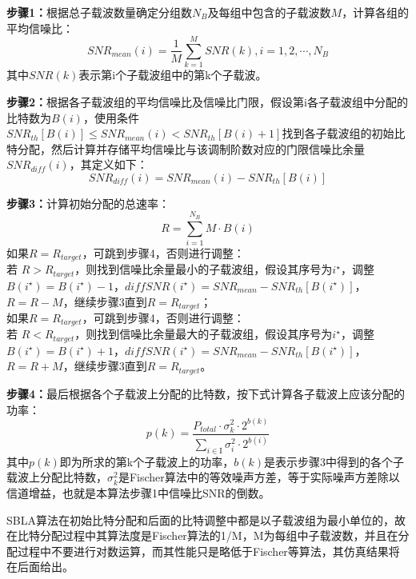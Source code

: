 \begin{description}
\item{\bf{步骤1：}}根据总子载波数量确定分组数$N_B$及每组中包含的子载波数$M$，计算各组的平均信噪比：
\begin{equation}
SNR_{mean}(i) = \frac{1}{M}\sum_{k=1}^M SNR(k), i=1,2,\cdots,N_B
\end{equation}
其中$SNR(k)$表示第i个子载波组中的第k个子载波。
\item{\bf{步骤2：}}根据各子载波组的平均信噪比及信噪比门限，假设第i各子载波组中分配的比特数为$B(i)$，使用条件$SNR_{th}[B(i)]\leq SNR_{mean}(i) < SNR_{th}[B(i)+1]$找到各子载波组的初始比特分配，然后计算并存储平均信噪比与该调制阶数对应的门限信噪比余量$SNR_{diff}(i)$，其定义如下：
\begin{equation}
SNR_{diff}(i) = SNR_{mean}(i) - SNR_{th}[B(i)]
\end{equation}
\item{\bf{步骤3：}}计算初始分配的总速率：
\begin{equation}
R = \sum_{i=1}^{N_B} M \cdot B(i)
\end{equation}
如果$R=R_{target}$，可跳到步骤4，否则进行调整：\\
若 $R>R_{target}$，则找到信噪比余量最小的子载波组，假设其序号为$i^\star$，调整$B(i^\star)=B(i^\star)-1$，$diffSNR(i^\star)=SNR_{mean}-SNR_{th}[B(i^\star)]$，$R=R-M$，继续步骤3直到$R=R_{target}$；\\
如果$R=R_{target}$，可跳到步骤4，否则进行调整：\\
若 $R<R_{target}$，则找到信噪比余量最大的子载波组，假设其序号为$i^\star$，调整$B(i^\star)=B(i^\star)+1$，$diffSNR(i^\star)=SNR_{mean}-SNR_{th}[B(i^\star)]$，$R=R+M$，继续步骤3直到$R=R_{target}$。\\
\item{\bf{步骤4：}}最后根据各个子载波上分配的比特数，按下式计算各子载波上应该分配的功率：
\begin{equation}
\label{equ:calcSLABPower}
p(k) = \frac{P_{total}\cdot \sigma_k^2\cdot 2^{{b}(k)}}{\sum_{i\in \mathrm{I}}\sigma_i^2\cdot 2^{{b}(i)}}
\end{equation}
其中$p(k)$即为所求的第k个子载波上的功率，$b(k)$是表示步骤3中得到的各个子载波上分配比特数，$\sigma_k^2$是Fischer算法中的等效噪声方差，等于实际噪声方差除以信道增益，也就是本算法步骤1中信噪比SNR的倒数。
\end{description}

SBLA算法在初始比特分配和后面的比特调整中都是以子载波组为最小单位的，故在比特分配过程中其算法度是Fischer算法的1/M，M为每组中子载波数，并且在分配过程中不要进行对数运算，而其性能只是略低于Fischer等算法，其仿真结果将在后面给出。
